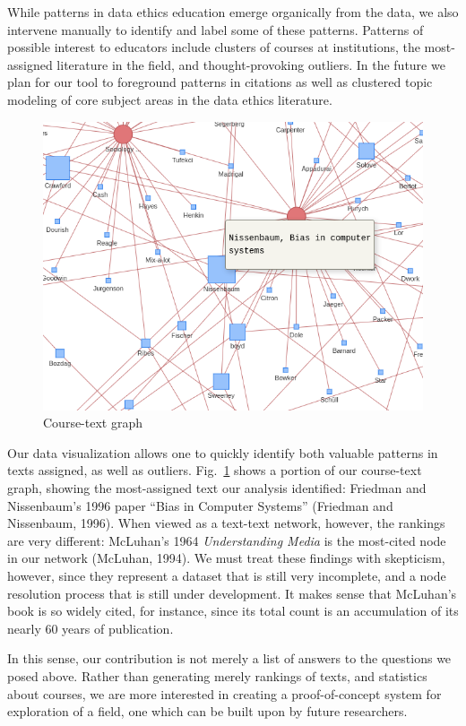 \documentclass[
]{article}
\begin{document}
While patterns in data ethics education emerge organically from the
data, we also intervene manually to identify and label some of these
patterns. Patterns of possible interest to educators include clusters of
courses at institutions, the most-assigned literature in the field, and
thought-provoking outliers. In the future we plan for our tool to
foreground patterns in citations as well as clustered topic modeling of
core subject areas in the data ethics literature.

\begin{figure}
\hypertarget{fig:graph}{%
\centering
\includegraphics{course-text.png}
\caption{Course-text graph}\label{fig:graph}
}
\end{figure}

Our data visualization allows one to quickly identify both valuable
patterns in texts assigned, as well as outliers. Fig.~\ref{fig:graph}
shows a portion of our course-text graph, showing the most-assigned text
our analysis identified: Friedman and Nissenbaum's 1996 paper ``Bias in
Computer Systems'' (Friedman and Nissenbaum, 1996). When viewed as a
text-text network, however, the rankings are very different: McLuhan's
1964 \emph{Understanding Media} is the most-cited node in our network
(McLuhan, 1994). We must treat these findings with skepticism, however,
since they represent a dataset that is still very incomplete, and a node
resolution process that is still under development. It makes sense that
McLuhan's book is so widely cited, for instance, since its total count
is an accumulation of its nearly 60 years of publication.

In this sense, our contribution is not merely a list of answers to the
questions we posed above. Rather than generating merely rankings of
texts, and statistics about courses, we are more interested in creating
a proof-of-concept system for exploration of a field, one which can be
built upon by future researchers.
\end{document}
